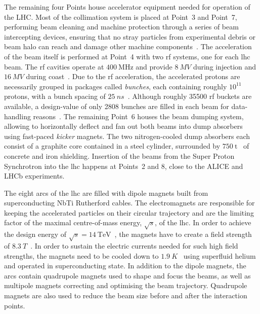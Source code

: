 The remaining four Points house accelerator equipment needed for operation of the LHC.
Most of the collimation system is placed at Point~3 and Point~7, performing beam cleaning and machine protection through a series of beam intercepting devices, ensuring that no stray particles from experimental debris or beam halo can reach and damage other machine components~\cite{Bruning:782076}.
The acceleration of the beam itself is performed at Point~4 with two \gls{rf} systems, one for each \gls{lhc} beam. The \gls{rf} cavities operate at $\SI{400}{\MHz}$ and provide $\SI{8}{MV}$ during injection and $\SI{16}{MV}$ during coast~\cite{Bruning:782076}.
Due to the \gls{rf} acceleration, the accelerated protons are necessarily grouped in packages called \textit{bunches}, each containing roughly $10^{11}$ protons, with a bunch spacing of $\SI{25}{ns}$~\cite{Bruning:782076}. Although roughly \num[group-separator={,}]{35500} \gls{rf} buckets are available, a design-value of only 2808 bunches are filled in each beam for data-handling reasons~\cite{Bruning:782076}.
The remaining Point~6 houses the beam dumping system, allowing to horizontally deflect and fan out both beams into dump absorbers using fast-paced \textit{kicker} magnets.
The two nitrogen-cooled dump absorbers each consist of a graphite core contained in a steel cylinder, surrounded by $\SI{750}{\tonne}$~\cite{Bruning:782076} of concrete and iron shielding.
Insertion of the beams from the Super Proton Synchrotron into the \gls{lhc} happens at Points~2 and 8, close to the ALICE and LHCb experiments.

The eight arcs of the \gls{lhc} are filled with dipole magnets built from superconducting NbTi Rutherford cables.
The electromagnets are responsible for keeping the accelerated particles on their circular trajectory and are the limiting factor of the maximal centre-of-mass energy, $\sqrt{s}$, of the \gls{lhc}. In order to achieve the design energy of $\sqrt{s} = \SI{14}{\TeV}$~\cite{Bruning:782076}, the magnets have to create a field strength of $\SI{8.3}{T}$~\cite{Bruning:782076}.
In order to sustain the electric currents needed for such high field strengths, the magnets need to be cooled down to $\SI{1.9}{K}$~\cite{Bruning:782076} using superfluid helium and operated in superconducting state.
In addition to the dipole magnets, the arcs contain quadrupole magnets used to shape and focus the beams, as well as multipole magnets correcting and optimising the beam trajectory.
Quadrupole magnets are also used to reduce the beam size before and after the interaction points.

